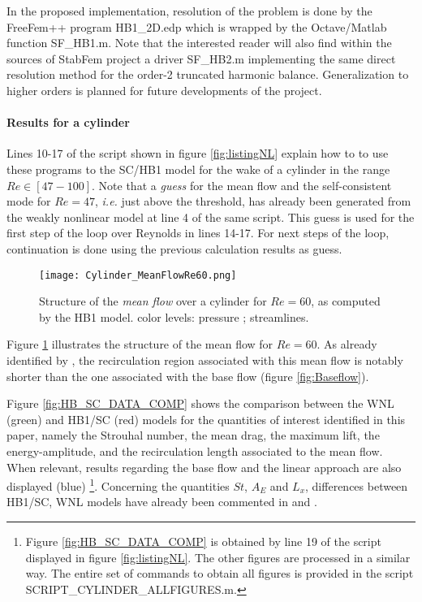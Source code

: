 \documentclass[twocolumn,10pt]{asme2ej}
\begin{document}
In the proposed implementation, resolution of the problem is done by the FreeFem++ program {\sf  HB1\_2D.edp} which is wrapped by the Octave/Matlab function {\sf  SF\_HB1.m}.
Note that the interested reader will also find within the sources of StabFem project a driver {\sf  SF\_HB2.m} implementing the same direct resolution method for the order-2 truncated harmonic balance.
Generalization to higher orders is planned for future developments of the project.
  
 \paragraph{Results for a cylinder}
 
Lines 10-17 of the script shown in figure \ref{fig:listingNL} explain how to to use these programs to the SC/HB1 model for the wake of a cylinder in the range $Re \in [47-100] $. Note that a {\em guess} for the mean flow and the self-consistent mode for $Re = 47$, \textit{i.e.} just above the threshold, has already been generated from the weakly nonlinear model at line 4 of the same script. This guess is used for the first step of the loop over Reynolds in lines 14-17. For next steps of the loop, continuation is done using the previous calculation results as guess. 

\begin{figure}
\begin{center}
\texttt{[image: Cylinder\_MeanFlowRe60.png]}
\end{center}
\caption{Structure of the {\em mean flow} over a cylinder for $Re = 60$, as computed by the HB1 model. color levels: pressure ; streamlines.}
\label{fig:MF60}
\end{figure}



Figure \ref{fig:MF60} illustrates the structure of the mean flow for $Re=60$.
As already identified by  \cite{MLugo2014}, the recirculation region associated with this mean flow is notably shorter than the one associated with the base flow (figure \ref{fig:Baseflow}). 



Figure \ref{fig:HB_SC_DATA_COMP} shows the comparison between the WNL (green) and HB1/SC (red) models for the quantities of interest identified in this paper, namely the Strouhal number, the mean drag, the maximum lift, the energy-amplitude, and the recirculation length associated to the mean flow. When relevant, results regarding the base flow and the linear approach are also displayed (blue)
\footnote{Figure   \ref{fig:HB_SC_DATA_COMP} is obtained by line 19 of the script displayed in figure \ref{fig:listingNL}. The other figures are processed in a similar way. The entire set of commands to obtain all figures is provided in the script {\sf SCRIPT\_CYLINDER\_ALLFIGURES.m}.}.
Concerning the quantities $St$, $A_E$ and $L_x$, differences between HB1/SC, WNL models have already been commented in \cite{MLugo2014} and \cite{FDR2016}. 
\end{document}

